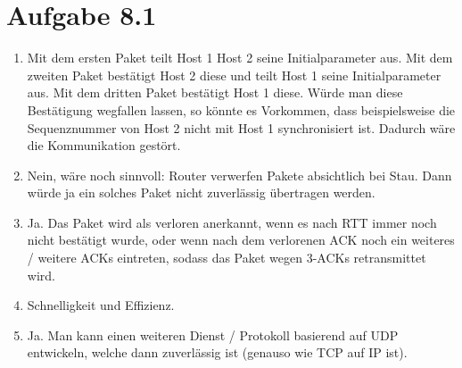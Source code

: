 \documentclass[12pt, a4paper]{article}
\begin{document}
\begin{center}\end{center}



\section*{Aufgabe 8.1}
\begin{enumerate}[label=\alph*)]
	\item	Mit dem ersten Paket teilt Host 1 Host 2 seine Initialparameter aus. Mit dem zweiten Paket bestätigt Host 2 diese und teilt Host 1 seine Initialparameter aus. Mit dem dritten Paket bestätigt Host 1 diese. Würde man diese Bestätigung wegfallen lassen, so könnte es Vorkommen, dass beispielsweise die Sequenznummer von Host 2 nicht mit Host 1 synchronisiert ist. Dadurch wäre die Kommunikation gestört.
	\item	Nein, wäre noch sinnvoll: Router verwerfen Pakete absichtlich bei Stau. Dann würde ja ein solches Paket nicht zuverlässig übertragen werden.
	\item	Ja. Das Paket wird als verloren anerkannt, wenn es nach RTT immer noch nicht bestätigt wurde, oder wenn nach dem verlorenen ACK noch ein weiteres / weitere ACKs eintreten, sodass das Paket wegen 3-ACKs retransmittet wird.
	\item	Schnelligkeit und Effizienz.
	\item	Ja. Man kann einen weiteren Dienst / Protokoll basierend auf UDP entwickeln, welche dann zuverlässig ist (genauso wie TCP auf IP ist).
\end{enumerate}


\newpage
\end{document}
